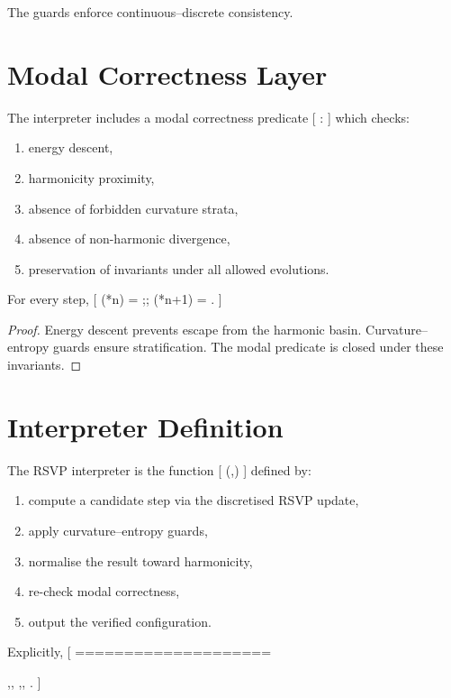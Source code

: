The guards enforce continuous--discrete consistency.

\section{Modal Correctness Layer}

The interpreter includes a modal correctness predicate
[
 : \to{}
]
which checks:
\begin{enumerate}
\item energy descent,
\item harmonicity proximity,
\item absence of forbidden curvature strata,
\item absence of non-harmonic divergence,
\item preservation of invariants under all allowed evolutions.
\end{enumerate}

\begin{lemma}
For every step,
[
(*n) = 
;\Longrightarrow;
(*{n+1}) = .
]
\end{lemma}

\begin{proof}
Energy descent prevents escape from the harmonic basin.
Curvature--entropy guards ensure stratification.
The modal predicate is closed under these invariants.
\end{proof}

\section{Interpreter Definition}

\begin{definition}
The RSVP interpreter is the function
[
(,)
]
defined by:
\begin{enumerate}
\item compute a candidate step via the discretised RSVP update,
\item apply curvature--entropy guards,
\item normalise the result toward harmonicity,
\item re-check modal correctness,
\item output the verified configuration.
\end{enumerate}

Explicitly,
[
====================

,\circ,
,\circ,
.
]
\end{definition}

